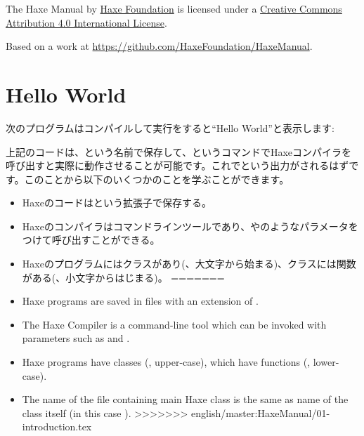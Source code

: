The Haxe Manual by \href{http://haxe.org/foundation}{Haxe Foundation} is licensed under a \href{http://creativecommons.org/licenses/by/4.0/}{Creative Commons Attribution 4.0 International License}.

Based on a work at \href{https://github.com/HaxeFoundation/HaxeManual}{https://github.com/HaxeFoundation/HaxeManual}.

\section{Hello World}
\label{introduction-hello-world}

次のプログラムはコンパイルして実行をすると``Hello World''と表示します:


上記のコードは、という名前で保存して、というコマンドでHaxeコンパイラを呼び出すと実際に動作させることが可能です。これでという出力がされるはずです。このことから以下のいくつかのことを学ぶことができます。


\begin{itemize}
<<<<<<< HEAD:01-introduction.tex
	\item Haxeのコードはという拡張子で保存する。
	\item Haxeのコンパイラはコマンドラインツールであり、やのようなパラメータをつけて呼び出すことができる。
	\item Haxeのプログラムにはクラスがあり(、大文字から始まる)、クラスには関数がある(、小文字からはじまる)。
=======
	\item Haxe programs are saved in files with an extension of .
	\item The Haxe Compiler is a command-line tool which can be invoked with parameters such as  and .
	\item Haxe programs have classes (, upper-case), which have functions (, lower-case). 
	\item The name of the file containing main Haxe class is the same as name of the class itself (in this case ). 
>>>>>>> english/master:HaxeManual/01-introduction.tex
\end{itemize}

